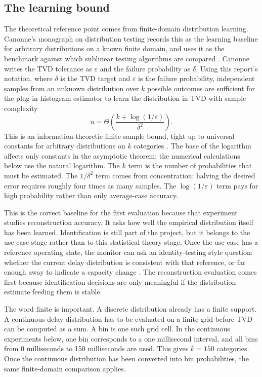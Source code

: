 \documentclass[a4paper,11pt]{report}
\begin{document}
\subsection{The learning bound}

The theoretical reference point comes from finite-domain distribution learning. Canonne's monograph on distribution testing records this as the learning baseline for arbitrary distributions on a known finite domain, and uses it as the benchmark against which sublinear testing algorithms are compared \cite{canonneTopics}. Canonne writes the TVD tolerance as \(\varepsilon\) and the failure probability as \(\delta\). Using this report's notation, where \(\delta\) is the TVD target and \(\varepsilon\) is the failure probability, independent samples from an unknown distribution over \(k\) possible outcomes are sufficient for the plug-in histogram estimator to learn the distribution in TVD with sample complexity
\[
n = \Theta\left(\frac{k+\log(1/\varepsilon)}{\delta^2}\right).
\]
This is an information-theoretic finite-sample bound, tight up to universal constants for arbitrary distributions on \(k\) categories \cite{canonneShort,canonneTopics,devroyeLugosi}. The base of the logarithm affects only constants in the asymptotic theorem; the numerical calculations below use the natural logarithm. The \(k\) term is the number of probabilities that must be estimated. The \(1/\delta^2\) term comes from concentration: halving the desired error requires roughly four times as many samples. The \(\log(1/\varepsilon)\) term pays for high probability rather than only average-case accuracy.

This is the correct baseline for the first evaluation because that experiment studies reconstruction accuracy. It asks how well the empirical distribution itself has been learned. Identification is still part of the project, but it belongs to the use-case stage rather than to this statistical-theory stage. Once the use case has a reference operating state, the monitor can ask an identity-testing style question: whether the current delay distribution is consistent with that reference, or far enough away to indicate a capacity change \cite{canonneSurvey}. The reconstruction evaluation comes first because identification decisions are only meaningful if the distribution estimate feeding them is stable.

The word finite is important. A discrete distribution already has a finite support. A continuous delay distribution has to be evaluated on a finite grid before TVD can be computed as a sum. A bin is one such grid cell. In the continuous experiments below, one bin corresponds to a one millisecond interval, and all bins from 0 milliseconds to 150 milliseconds are used. This gives \(k=150\) categories. Once the continuous distribution has been converted into bin probabilities, the same finite-domain comparison applies.
\end{document}
